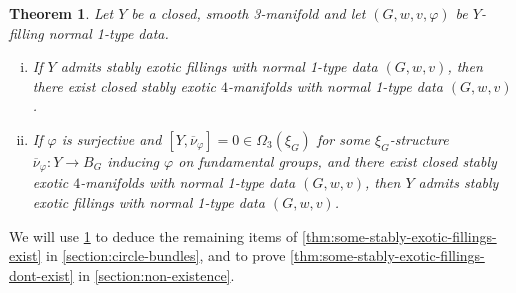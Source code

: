\documentclass[a4paper, reqno]{amsart}
\newtheorem{theorem}[proposition]{Theorem}
\theoremstyle{definition}
\theoremstyle{remark}
\newcommand{\ol}{\overline}
\begin{document}
\begin{theorem}\label{thm:main-characterisation}
Let $Y$ be a closed, smooth 3-manifold and let $(G,w,v,\varphi)$ be $Y$-filling normal 1-type data.
\begin{enumerate}[(i)]
    \item\label{item-main-characterisation-i} If $Y$ admits stably exotic fillings with normal 1-type data $(G,w,v)$, then there exist closed stably exotic $4$-manifolds with normal 1-type data $(G,w,v)$.
    \item\label{item-main-characterisation-ii}  If $\varphi$ is surjective and $[Y,\ol{\nu}_\varphi] = 0 \in \Omega_3(\xi_G)$ for some $\xi_G$-structure $\ol{\nu}_\varphi \colon Y \to B_G$ inducing $\varphi$ on fundamental groups, and there exist closed stably exotic $4$-manifolds with normal 1-type data $(G,w,v)$, then $Y$ admits stably exotic fillings with normal 1-type data $(G,w,v)$.
\end{enumerate}
\end{theorem}

We will use \cref{thm:main-characterisation} to deduce the remaining items of \cref{thm:some-stably-exotic-fillings-exist} in \cref{section:circle-bundles}, and to prove \cref{thm:some-stably-exotic-fillings-dont-exist} in \cref{section:non-existence}.
\end{document}
